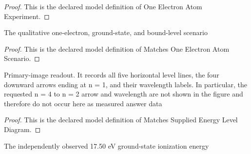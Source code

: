\begin{proof}
  This is the declared model definition of One Electron Atom Experiment.
\end{proof}
\begin{definition}
  \label{def:physics:phyx-mini-0519:phyxminiproblems-problemphyxmini0519-matchesoneelectronatomscenario}
  The qualitative one-electron, ground-state, and bound-level scenario
\end{definition}
\begin{proof}
  This is the declared model definition of Matches One Electron Atom Scenario.
\end{proof}
\begin{definition}
  \label{def:physics:phyx-mini-0519:phyxminiproblems-problemphyxmini0519-matchessuppliedenergyleveldiagram}
  Primary-image readout. It records all five horizontal level lines, the four downward arrows ending at n = 1, and their wavelength labels. In particular, the requested n = 4 to n = 2 arrow and wavelength are not shown in the figure and therefore do not occur here as measured answer data
\end{definition}
\begin{proof}
  This is the declared model definition of Matches Supplied Energy Level Diagram.
\end{proof}
\begin{definition}
  \label{def:physics:phyx-mini-0519:phyxminiproblems-problemphyxmini0519-matchesionizationenergymeasurement}
  The independently observed 17.50 eV ground-state ionization energy
\end{definition}

